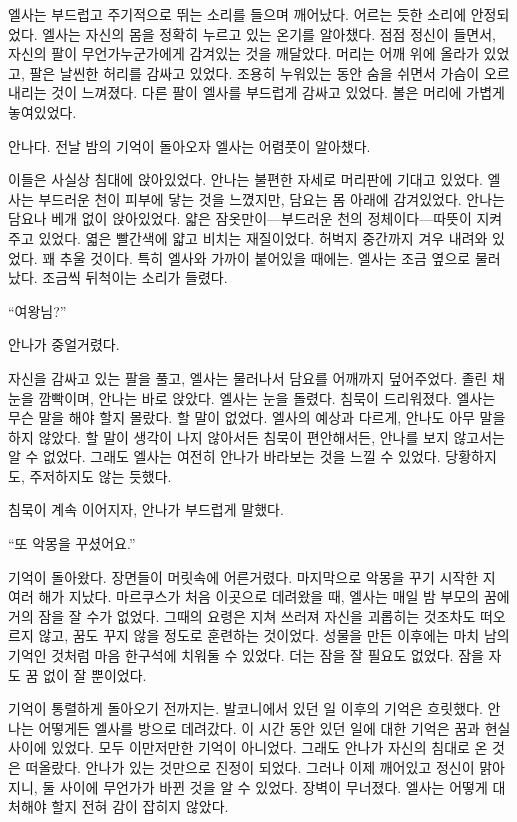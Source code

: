엘사는 부드럽고 주기적으로 뛰는 소리를 들으며 깨어났다. 어르는 듯한 소리에 안정되었다. 엘사는 자신의 몸을 정확히 누르고 있는 온기를 알아챘다. 점점 정신이 들면서, 자신의 팔이 무언가 누군가에게 감겨있는 것을 깨달았다. 머리는 어깨 위에 올라가 있었고, 팔은 날씬한 허리를 감싸고 있었다. 조용히 누워있는 동안 숨을 쉬면서 가슴이 오르내리는 것이 느껴졌다. 다른 팔이 엘사를 부드럽게 감싸고 있었다. 볼은 머리에 가볍게 놓여있었다.

안나다. 전날 밤의 기억이 돌아오자 엘사는 어렴풋이 알아챘다.

이들은 사실상 침대에 앉아있었다. 안나는 불편한 자세로 머리판에 기대고 있었다. 엘사는 부드러운 천이 피부에 닿는 것을 느꼈지만, 담요는 몸 아래에 감겨있었다. 안나는 담요나 베개 없이 앉아있었다. 얇은 잠옷만이—부드러운 천의 정체이다—따뜻이 지켜주고 있었다. 엷은 빨간색에 얇고 비치는 재질이었다. 허벅지 중간까지 겨우 내려와 있었다. 꽤 추울 것이다. 특히 엘사와 가까이 붙어있을 때에는. 엘사는 조금 옆으로 물러났다. 조금씩 뒤척이는 소리가 들렸다.

``여왕님?''

안나가 중얼거렸다.

자신을 감싸고 있는 팔을 풀고, 엘사는 물러나서 담요를 어깨까지 덮어주었다. 졸린 채 눈을 깜빡이며, 안나는 바로 앉았다. 엘사는 눈을 돌렸다. 침묵이 드리워졌다. 엘사는 무슨 말을 해야 할지 몰랐다. 할 말이 없었다. 엘사의 예상과 다르게, 안나도 아무 말을 하지 않았다. 할 말이 생각이 나지 않아서든 침묵이 편안해서든, 안나를 보지 않고서는 알 수 없었다. 그래도 엘사는 여전히 안나가 바라보는 것을 느낄 수 있었다. 당황하지도, 주저하지도 않는 듯했다.

침묵이 계속 이어지자, 안나가 부드럽게 말했다.

``또 악몽을 꾸셨어요.''

기억이 돌아왔다. 장면들이 머릿속에 어른거렸다. 마지막으로 악몽을 꾸기 시작한 지 여러 해가 지났다. 마르쿠스가 처음 이곳으로 데려왔을 때, 엘사는 매일 밤 부모의 꿈에 거의 잠을 잘 수가 없었다. 그때의 요령은 지쳐 쓰러져 자신을 괴롭히는 것조차도 떠오르지 않고, 꿈도 꾸지 않을 정도로 훈련하는 것이었다. 성물을 만든 이후에는 마치 남의 기억인 것처럼 마음 한구석에 치워둘 수 있었다. 더는 잠을 잘 필요도 없었다. 잠을 자도 꿈 없이 잘 뿐이었다.

기억이 통렬하게 돌아오기 전까지는. 발코니에서 있던 일 이후의 기억은 흐릿했다. 안나는 어떻게든 엘사를 방으로 데려갔다. 이 시간 동안 있던 일에 대한 기억은 꿈과 현실 사이에 있었다. 모두 이만저만한 기억이 아니었다. 그래도 안나가 자신의 침대로 온 것은 떠올랐다. 안나가 있는 것만으로 진정이 되었다. 그러나 이제 깨어있고 정신이 맑아지니, 둘 사이에 무언가가 바뀐 것을 알 수 있었다. 장벽이 무너졌다. 엘사는 어떻게 대처해야 할지 전혀 감이 잡히지 않았다.

